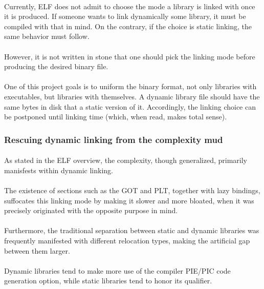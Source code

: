 \documentclass[12pt]{article}
\begin{document}
	\paragraph{}Currently, ELF does not admit to choose the mode a library is linked with once it is produced. If someone wants to link dynamically some library, it must be compiled with that in mind. On the contrary, if the choice is static linking,  the same behavior must follow.
	\paragraph{}However, it is not written in stone that one should pick the linking mode before producing the desired binary file.
	\paragraph{}One of this project goals is to uniform the binary format, not only libraries with executables, but libraries with themselves. A dynamic library file should have the same bytes in disk that a static version of it. Accordingly, the linking choice can be postponed until linking time (which, when read, makes total sense).
	
	\subsubsection{Rescuing dynamic linking from the complexity mud}
	\paragraph{} As stated in the ELF overview, the complexity, though generalized, primarily manisfests within dynamic linking.
	\paragraph{}The existence of sections such as the GOT and PLT, together with lazy bindings, suffocates this linking mode by making it slower and more bloated, when it was precisely originated with the opposite purpose in mind.
	\paragraph{}Furthermore, the traditional separation between static and dynamic libraries was frequently manifested with different relocation types, making the artificial gap between them larger.
	\paragraph{}Dynamic libraries tend to make more use of the compiler PIE/PIC code generation option, while static libraries tend to honor its qualifier.
\end{document}

